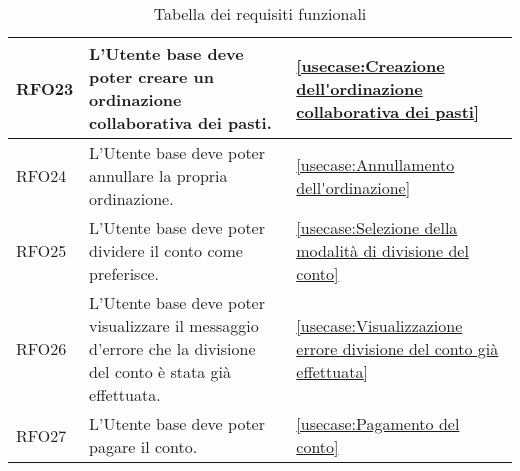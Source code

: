 \begin{table}[H]
\begin{tabularx}{\textwidth}{l|X|p{2cm}}
		\hline
		RFO23       & L'Utente base deve poter creare un ordinazione collaborativa dei pasti.                          				 				&  \autoref{usecase:Creazione dell'ordinazione collaborativa dei pasti}           \\
		\hline
		RFO24       & L'Utente base deve poter annullare la propria ordinazione.                          				 						&  \autoref{usecase:Annullamento dell'ordinazione}           \\
		\hline
		RFO25       & L'Utente base deve poter dividere il conto come preferisce.												       				 &  \autoref{usecase:Selezione della modalità di divisione del conto}           \\
		\hline
		RFO26       & L'Utente base deve poter visualizzare il messaggio d'errore che la divisione del conto è stata già effettuata.			 &  \autoref{usecase:Visualizzazione errore divisione del conto già effettuata}           \\
		\hline
		RFO27       & L'Utente base deve poter pagare il conto.												       								&  \autoref{usecase:Pagamento del conto}           \\

	\end{tabularx}
\caption{Tabella dei requisiti funzionali}
\end{table}



